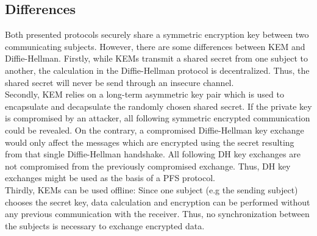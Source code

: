 \subsection{Differences}
Both presented protocols securely share a symmetric encryption key between two communicating subjects. However, there are some differences between \gls{KEM} and Diffie-Hellman. Firstly, while \glspl{KEM} transmit a shared secret from one subject to another, the calculation in the Diffie-Hellman protocol is decentralized. Thus, the shared secret will never be send through an insecure channel.\\
Secondly, \gls{KEM} relies on a long-term asymmetric key pair which is used to encapsulate and decapsulate the randomly chosen shared secret. If the private key is compromised by an attacker, all following symmetric encrypted communication could be revealed. On the contrary, a compromised Diffie-Hellman key exchange would only affect the messages which are encrypted using the secret resulting from that single Diffie-Hellman handshake. All following \gls{DH} key exchanges are not compromised from the previously compromised exchange. Thus, \gls{DH} key exchanges might be used as the basis of a \gls{PFS} protocol.\\
Thirdly, KEMs can be used offline: Since one subject (e.g the sending subject) chooses the secret key, data calculation and encryption can be performed without any previous communication with the receiver. Thus, no synchronization between the subjects is necessary to exchange encrypted data.
\newpage
